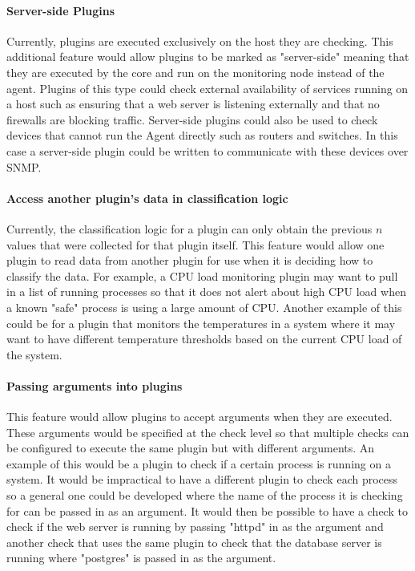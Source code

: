 \documentclass[bsc,logo,twoside,singlespacing,notimes]{infthesis}
\begin{document}
\paragraph*{Server-side Plugins}
	Currently, plugins are executed exclusively on the host they are checking. This
	additional feature would allow plugins to be marked as "server-side" meaning 
	that they are executed by the core and run on the monitoring node instead of
	the agent.   Plugins of this type could check external availability of services
	running on a host such as ensuring that a web server is listening externally
	and that no firewalls are blocking traffic.  Server-side plugins could also be
	used to check devices that cannot run the Agent directly such as routers and
	switches.  In this case a server-side plugin could be written to communicate
	with these devices over SNMP.
	
\paragraph*{Access another plugin's data in classification logic}
	Currently, the classification logic for a plugin can only obtain the previous
	$n$ values that were collected for that plugin itself.  This feature would
	allow one plugin to read data from another plugin for use when it is deciding
	how to classify the data.  For example, a CPU load monitoring plugin may want
	to pull in a list of running processes so that it does not alert about high CPU
	load when a known "safe" process is using a large amount of CPU. Another
	example of this could be for a plugin that monitors the temperatures in a
	system where it may want to have different temperature thresholds based on the
	current CPU load of the system.
	
\paragraph*{Passing arguments into plugins}
	This feature would allow plugins to accept arguments when they are executed.
	These arguments would be specified at the check level so that multiple checks
	can be configured to execute the same plugin but with different arguments. An
	example of this would be a plugin to check if a certain process is running on
	a system.  It would be impractical to have a different plugin to check each
	process so a general one could be developed where the name of the process it
	is checking for can be passed in as an argument.  It would then be possible to
	have a check to check if the web server is running by passing "httpd" in as the
	argument and another check that uses the same plugin to check that the database
	server is running where "postgres" is passed in as the argument.
	
\end{document}
